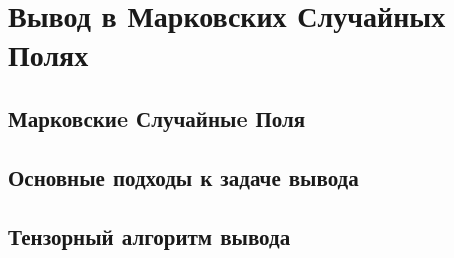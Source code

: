 \chapter{Вывод в Марковских Случайных Полях} \label{chap:mrf}
\section{Марковскиe Случайныe Поля} \label{sec:mrf}
\section{Основные подходы к задаче вывода} \label{sec:mrf-approaches}
\section{Тензорный алгоритм вывода} \label{sec:tt-mrf}
